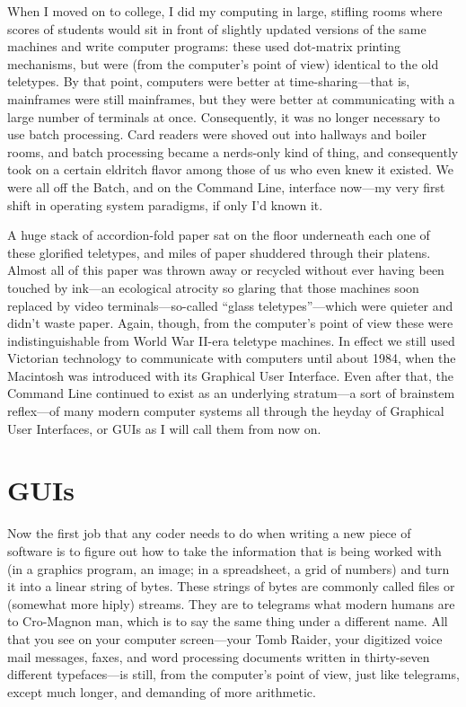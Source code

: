 \documentclass[
  fontsize=11pt,
  paper=landscape,
  twocolumn=true,
  pagesize=pdftex,
  headings=small,
  DIV=15,
  ]{scrartcl}
\begin{document}
When I moved on to college, I did my computing in large, stifling rooms
where scores of students would sit in front of slightly updated versions
of the same machines and write computer programs: these used dot-matrix
printing mechanisms, but were (from the computer's point of view)
identical to the old teletypes. By that point, computers were better at
time-sharing---that is, mainframes were still mainframes, but they were
better at communicating with a large number of terminals at once.
Consequently, it was no longer necessary to use batch processing. Card
readers were shoved out into hallways and boiler rooms, and batch
processing became a nerds-only kind of thing, and consequently took on a
certain eldritch flavor among those of us who even knew it existed. We
were all off the Batch, and on the Command Line, interface now---my very
first shift in operating system paradigms, if only I'd known it.

A huge stack of accordion-fold paper sat on the floor underneath each
one of these glorified teletypes, and miles of paper shuddered through
their platens. Almost all of this paper was thrown away or recycled
without ever having been touched by ink---an ecological atrocity so
glaring that those machines soon replaced by video terminals---so-called
``glass teletypes''---which were quieter and didn't waste paper. Again,
though, from the computer's point of view these were indistinguishable
from World War II-era teletype machines. In effect we still used
Victorian technology to communicate with computers until about 1984,
when the Macintosh was introduced with its Graphical User Interface.
Even after that, the Command Line continued to exist as an underlying
stratum---a sort of brainstem reflex---of many modern computer systems
all through the heyday of Graphical User Interfaces, or GUIs as I will
call them from now on.

\section{GUIs}

Now the first job that any coder needs to do when writing a new piece of
software is to figure out how to take the information that is being
worked with (in a graphics program, an image; in a spreadsheet, a grid
of numbers) and turn it into a linear string of bytes. These strings of
bytes are commonly called files or (somewhat more hiply) streams. They
are to telegrams what modern humans are to Cro-Magnon man, which is to
say the same thing under a different name. All that you see on your
computer screen---your Tomb Raider, your digitized voice mail messages,
faxes, and word processing documents written in thirty-seven different
typefaces---is still, from the computer's point of view, just like
telegrams, except much longer, and demanding of more arithmetic.
\end{document}
